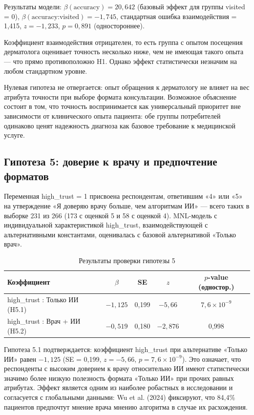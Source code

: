 \documentclass[12pt, a4paper]{article}
\begin{document}
Результаты модели: $\beta(\text{accuracy}) = 20,642$ (базовый эффект для группы visited = 0), $\beta(\text{accuracy:visited}) = -1,745$, стандартная ошибка взаимодействия = 1,415, $z = -1,233$, $p = 0,891$ (одностороннее).

Коэффициент взаимодействия отрицателен, то есть группа с опытом посещения дерматолога оценивает точность несколько ниже, чем не имеющая такого опыта --- что прямо противоположно H1. Однако эффект статистически незначим на любом стандартном уровне.

Нулевая гипотеза не отвергается: опыт обращения к дерматологу не влияет на вес атрибута точности при выборе формата консультации. Возможное объяснение состоит в том, что точность воспринимается как универсальный приоритет вне зависимости от клинического опыта пациента: обе группы потребителей одинаково ценят надежность диагноза как базовое требование к медицинской услуге.

\subsection{Гипотеза 5: доверие к врачу и предпочтение форматов}
Переменная high\_trust = 1 присвоена респондентам, ответившим «4» или «5» на утверждение «Я доверяю врачу больше, чем алгоритмам ИИ» --- всего таких в выборке 231 из 266 (173 с оценкой 5 и 58 с оценкой 4). MNL-модель с индивидуальной характеристикой high\_trust, взаимодействующей с альтернативными константами, оценивалась с базовой альтернативой «Только врач».

\begin{table}[h]
\centering
\caption{Результаты проверки гипотезы 5}
\label{tab:hyp5}
\small
\begin{tabular}{lcccc}
\toprule
\textbf{Коэффициент} & \textbf{$\beta$} & \textbf{SE} & \textbf{$z$} & \textbf{$p$-value (одностор.)} \\
\midrule
high\_trust : Только ИИ (H5.1) & $-1,125$ & 0,199 & $-5,66$ & $7,6 \times 10^{-9}$ \\
high\_trust : Врач + ИИ (H5.2) & $-0,519$ & 0,180 & $-2,876$ & 0,998 \\
\bottomrule
\end{tabular}
\end{table}

Гипотеза 5.1 подтверждается: коэффициент high\_trust при альтернативе «Только ИИ» равен $-1,125$ (SE = 0,199, $z = -5,66$, $p = 7,6\times10^{-9}$). Это означает, что респонденты с высоким доверием к врачу относительно ИИ имеют статистически значимо более низкую полезность формата «Только ИИ» при прочих равных атрибутах. Эффект является одним из наиболее робастных в исследовании и согласуется с глобальными данными: Wu et al. (2024) фиксируют, что 84,4\% пациентов предпочтут мнение врача мнению алгоритма в случае их расхождения.
\end{document}
